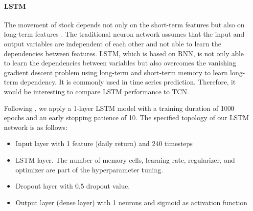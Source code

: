 \documentclass{article}
\begin{document}
\paragraph{LSTM}
The movement of stock depends not only on the short-term features but also on long-term features \citep{krauss2017deep}. The traditional neuron network assumes that the input and output variables are independent of each other and not able to learn the dependencies between features. LSTM, which is based on RNN, is not only able to learn the dependencies between variables but also overcomes the vanishing gradient descent problem using long-term and short-term memory to learn long-term dependency. It is commonly used in time series prediction. Therefore, it would be interesting to compare LSTM performance to TCN. 

Following \cite{fischer2018deep}, we apply a 1-layer LSTM model with a training duration of 1000 epochs and an early stopping patience of 10. The specified topology of our LSTM network is as follows:
\begin{itemize}
  \item Input layer with 1 feature (daily return) and 240 timesteps
  \item LSTM layer. The number of memory cells, learning rate, regularizer, and optimizer are part of the hyperparameter tuning. 
  \item Dropout layer with 0.5 dropout value.
  \item Output layer (dense layer) with 1 neurons and sigmoid as activation function
\end{itemize}
\end{document}
